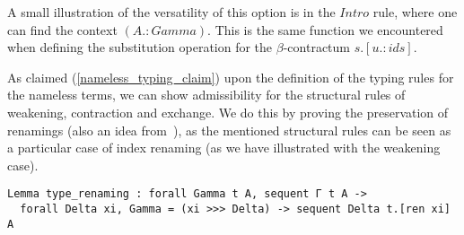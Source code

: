 A small illustration of the versatility of this option is in the \lst$Intro$ rule, where one can find the context \lst$(A.:Gamma)$.
This is the same function we encountered when defining the substitution operation for the $\beta$-contractum \lst$s.[u.:ids]$.

As claimed (\cref{nameless_typing_claim}) upon the definition of the typing rules for the nameless terms, we can show admissibility for the structural rules of weakening, contraction and exchange.
We do this by proving the preservation of renamings (also an idea from~\cite{AutosubstManual}), as the mentioned structural rules can be seen as a particular case of index renaming (as we have illustrated with the weakening case).

\begin{lstlisting}[language=Coq]
Lemma type_renaming : forall Gamma t A, sequent Γ t A ->
  forall Delta xi, Gamma = (xi >>> Delta) -> sequent Delta t.[ren xi] A
\end{lstlisting}
  
